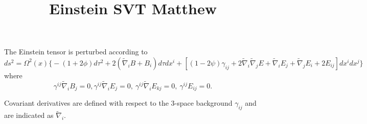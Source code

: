 \documentclass[10pt,letterpaper]{article}
\title{Einstein SVT Matthew}
\date{}
\begin{document}
\maketitle
\noindent
The Einstein tensor is perturbed according to
\begin{equation}
	ds^2 = \Omega^2(x) \big\{ -(1+2\phi) d\tau^2 + 2(\tilde\nabla_i B + B_i)d\tau dx^i + [ (1-2\psi)\gamma_{ij} + 2\tilde\nabla_i\tilde\nabla_j E + \tilde\nabla_i E_j + \tilde\nabla_j E_i + 2E_{ij}]dx^i dx^j\big\}
\end{equation}
where
\begin{equation}
	\gamma^{ij}\tilde\nabla_i B_j = 0,\gamma^{ij}\tilde\nabla_i E_j = 0,\ \gamma^{ij}\tilde\nabla_i E_{kj} = 0,\ \gamma^{ij}E_{ij} = 0.
\end{equation}

\noindent Covariant derivatives are defined with respect to the 3-space background $\gamma_{ij}$ and are indicated as $ \tilde\nabla_i$. 
\end{document}
